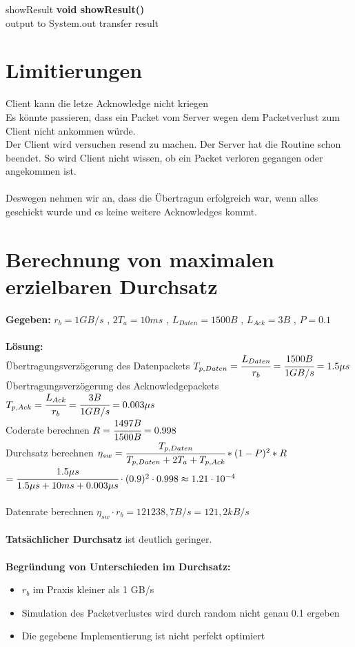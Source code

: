 \documentclass[12pt]{article}
\begin{document}
\begin{mybox}[colback=white]{showResult}
\textbf{void showResult()} \\
output to System.out transfer result 
\end{mybox}
\pagebreak

\section{Limitierungen}
{\Large Client kann die letze Acknowledge nicht kriegen }\\
Es könnte passieren, dass ein Packet vom Server wegen dem
Packetverlust zum Client nicht ankommen würde. \\
Der Client wird versuchen resend zu machen. Der Server hat die Routine 
schon beendet. So wird Client nicht wissen, ob ein Packet verloren
gegangen oder angekommen ist. \\ \\ Deswegen nehmen wir an, dass die
Übertragun erfolgreich war, wenn alles geschickt wurde
und es keine weitere Acknowledges kommt.

\section{Berechnung von maximalen erzielbaren Durchsatz}
\textbf{Gegeben:}
$ r_{b} = 1 GB/s $ , 
$ 2T_{a} = 10ms $ , 
$ L_{Daten} = 1500B $ , 
$ L_{Ack} = 3B $ ,
$ P = 0.1 $ 
\\ \\
\textbf{Lösung:} \\
Übertragungsverzögerung des Datenpackets $ T_{p,Daten} = \cfrac{L_{Daten}}{r_{b}} = 
\cfrac{1500B}{1 GB/s} = 1.5\mu s $ \\ 
Übertragungsverzögerung des Acknowledgepackets $ T_{p,Ack} = \cfrac{L_{Ack}}{r_{b}} = 
\cfrac{3B}{1 GB/s} = 0.003\mu s $ \\ 
Coderate berechnen $ R = \cfrac{1497B}{1500B} = 0.998 $ \\
Durchsatz berechnen $ \eta_{sw} = \cfrac{T_{p,Daten}}{T_{p,Daten} + 2T_{a} + T_{p,Ack}} * (1-P)^{2} * R $
\\$= \cfrac{1.5\mu s}{1.5\mu s + 10ms + 0.003\mu s} \cdot (0.9)^{2} \cdot 0.998 \approx 1.21 \cdot 10^{-4}$ \\ \\
Datenrate berechnen $ \eta_{sw} \cdot r_{b} = 121238,7 B/s = 121,2 kB/s $ 
\\ \\
\textbf{Tatsächlicher Durchsatz} ist deutlich geringer.
\\ \\
\textbf{Begründung von Unterschieden im Durchsatz:}
\begin{itemize}
\item $r_{b}$ im Praxis kleiner als 1 GB/s
\item Simulation des Packetverlustes wird durch random nicht genau 0.1 ergeben
\item Die gegebene Implementierung ist nicht perfekt optimiert
\end{itemize}
\pagebreak
\end{document}
